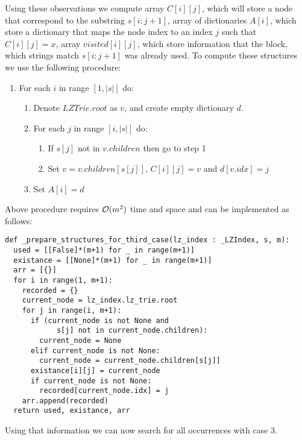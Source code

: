 Using these observations we compute array $C[i][j]$, which will store a node that correspond to the substring $s[i: j+1]$, array of dictionaries $A[i]$, which store a dictionary that maps the node index to an index $j$ such that $C[i][j] = x$, array $visited[i][j]$, which store information that the block, which strings match $s[i : j+1]$ was already used. To compute these structures we use the following procedure:

\begin{enumerate}
    \item For each $i$ in range $[1, |s|]$ do:
    \begin{enumerate}
        \item Denote $LZTrie.root$ as $v$, and create empty dictionary $d$.
        \item For each $j$ in range $[i, |s|]$ do:
        \begin{enumerate}
            \item If $s[j]$ not in $v.children$ then go to step 1
            \item Set $v = v.children[s[j]]$, $C[i][j] = v$ and $d[v.idx] = j$
        \end{enumerate}
        \item Set $A[i] = d$
    \end{enumerate}
\end{enumerate}

Above procedure requires $\mathcal{O}(m^2)$ time and space and can be implemented as follows:

\begin{verbatim}
def _prepare_structures_for_third_case(lz_index : _LZIndex, s, m):
  used = [[False]*(m+1) for _ in range(m+1)]
  existance = [[None]*(m+1) for _ in range(m+1)]
  arr = [{}]
  for i in range(1, m+1):
    recorded = {}
    current_node = lz_index.lz_trie.root
    for j in range(i, m+1):
      if (current_node is not None and
            s[j] not in current_node.children):
        current_node = None
      elif current_node is not None:
        current_node = current_node.children[s[j]]
      existance[i][j] = current_node
      if current_node is not None:
        recorded[current_node.idx] = j
    arr.append(recorded)
  return used, existance, arr
\end{verbatim}

Using that information we can now search for all occurrences with case 3.

